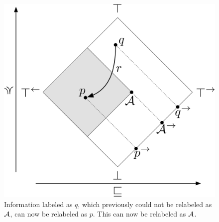 \begin{figure}
\begin{minipage}{0.6\columnwidth}
\includegraphics[scale=0.15]{Illustrations/bad-flow.pdf}
\end{minipage}%
\begin{minipage}{0.4\columnwidth}
\caption{Information labeled as $q$, which previously could not be relabeled as $\mathcal{A}$, can now be relabeled as $p$. This can now be relabeled as $\mathcal{A}$.}\label{fig:bad-release}
\end{minipage}
\end{figure}

